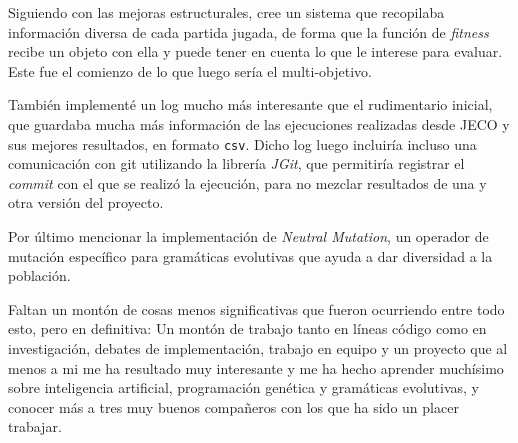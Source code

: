 Siguiendo con las mejoras estructurales, cree un sistema que recopilaba información diversa de cada partida jugada, de forma que la función de \textit{fitness} recibe un objeto con ella y puede tener en cuenta lo que le interese para evaluar. Este fue el comienzo de lo que luego sería el multi-objetivo.

También implementé un log mucho más interesante que el rudimentario inicial, que guardaba mucha más información de las ejecuciones realizadas desde JECO y sus mejores resultados, en formato \texttt{csv}. Dicho log luego incluiría incluso una comunicación con git utilizando la librería \textit{JGit}, que permitiría registrar el \textit{commit} con el que se realizó la ejecución, para no mezclar resultados de una y otra versión del proyecto.

Por último mencionar la implementación de \textit{Neutral Mutation}, un operador de mutación específico para gramáticas evolutivas que ayuda a dar diversidad a la población. 

Faltan un montón de cosas menos significativas que fueron ocurriendo entre todo esto, pero en definitiva: Un montón de trabajo tanto en líneas código como en investigación, debates de implementación, trabajo en equipo y un proyecto que al menos a mi me ha resultado muy interesante y me ha hecho aprender muchísimo sobre inteligencia artificial, programación genética y gramáticas evolutivas, y conocer más a tres muy buenos compañeros con los que ha sido un placer trabajar.
